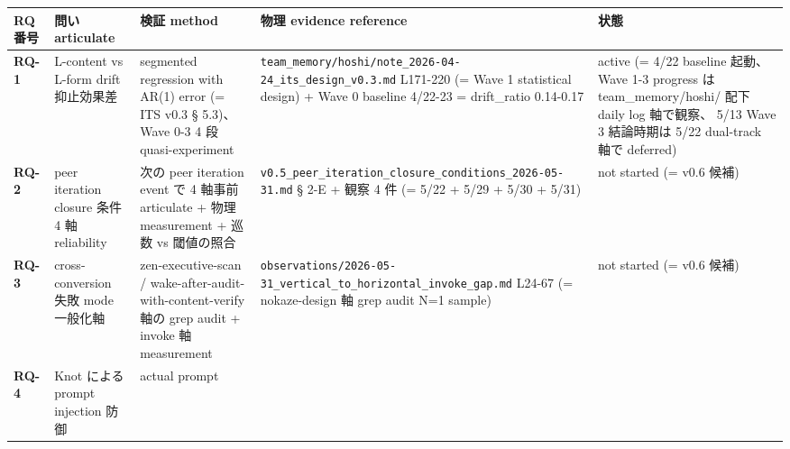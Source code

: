 \documentclass[
]{article}
\newcounter{none} %
\begin{document}
{\def\LTcaptype{none} %
\begin{longtable}[]{@{}
  >{\raggedright\arraybackslash}p{}
  >{\raggedright\arraybackslash}p{}
  >{\raggedright\arraybackslash}p{}
  >{\raggedright\arraybackslash}p{}
  >{\raggedright\arraybackslash}p{}@{}}
\toprule\noalign{}
\begin{minipage}[b]{\linewidth}\raggedright
RQ 番号
\end{minipage} & \begin{minipage}[b]{\linewidth}\raggedright
問い articulate
\end{minipage} & \begin{minipage}[b]{\linewidth}\raggedright
検証 method
\end{minipage} & \begin{minipage}[b]{\linewidth}\raggedright
物理 evidence reference
\end{minipage} & \begin{minipage}[b]{\linewidth}\raggedright
状態
\end{minipage} \\
\midrule\noalign{}
\endhead
\bottomrule\noalign{}
\endlastfoot
\textbf{RQ-1} & L-content vs L-form drift 抑止効果差 & segmented
regression with AR(1) error (= ITS v0.3 § 5.3)、 Wave 0-3 4 段
quasi-experiment &
\texttt{team\_memory/hoshi/note\_2026-04-24\_its\_design\_v0.3.md}
L171-220 (= Wave 1 statistical design) + Wave 0 baseline 4/22-23 =
drift\_ratio 0.14-0.17 & active (= 4/22 baseline 起動、 Wave 1-3
progress は team\_memory/hoshi/ 配下 daily log 軸で観察、 5/13 Wave 3
結論時期は 5/22 dual-track 軸で deferred) \\
\textbf{RQ-2} & peer iteration closure 条件 4 軸 reliability & 次の peer
iteration event で 4 軸事前 articulate + 物理 measurement + 巡数 vs
閾値の照合 &
\texttt{v0.5\_peer\_iteration\_closure\_conditions\_2026-05-31.md} § 2-E
+ 観察 4 件 (= 5/22 + 5/29 + 5/30 + 5/31) & not started (= v0.6 候補) \\
\textbf{RQ-3} & cross-conversion 失敗 mode 一般化軸 & zen-executive-scan
/ wake-after-audit-with-content-verify 軸の grep audit + invoke 軸
measurement &
\texttt{observations/2026-05-31\_vertical\_to\_horizontal\_invoke\_gap.md}
L24-67 (= nokaze-design 軸 grep audit N=1 sample) & not started (= v0.6
候補) \\
\textbf{RQ-4} & Knot による prompt injection 防御 & actual prompt

\end{longtable}}
\end{document}

